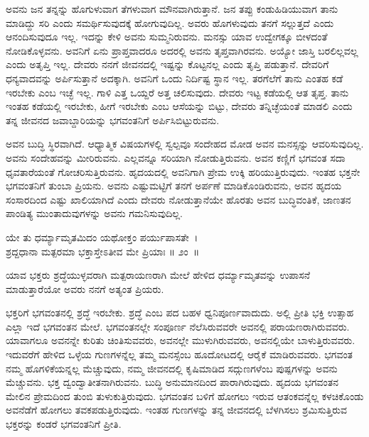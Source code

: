 ಅವನು ಜನ ತನ್ನನ್ನು ಹೊಗುಳುವಾಗ ತೆಗಳುವಾಗ ಮೌನವಾಗಿರುತ್ತಾನೆ. ಜನ ತಪ್ಪು ಕಂಡುಹಿಡಿಯುವಾಗ ತಾನು ಮಾಡಿದ್ದು ಸರಿ ಎಂದು ಸಮರ್ಥಿಸುವುದಕ್ಕೆ ಹೋಗುವುದಿಲ್ಲ. ಅವರು ಹೊಗಳುವುದು ತನಗೆ ಸಲ್ಲುತ್ತದೆ ಎಂದು ಆನಂದಿಸುವುದೂ ಇಲ್ಲ. ಇದನ್ನು ಕೇಳಿ ಅವನು ಸುಮ್ಮನಿರುವನು. ಮನಸ್ಸು ಯಾವ ಉದ್ವೇಗಕ್ಕೂ ಬೀಳದಂತೆ ನೋಡಿಕೊಳ್ಳವನು. ಅವನಿಗೆ ಏನು ಪ್ರಾಪ್ತವಾದರೂ ಅದರಲ್ಲಿ ಅವನು ತೃಪ್ತವಾಗಿರವನು. ಅಯ್ಯೋ ಜಾಸ್ತಿ ಬರಲಿಲ್ಲವಲ್ಲ ಎಂದು ಅತೃಪ್ತಿ ಇಲ್ಲ. ದೇವರು ನನಗೆ ಜೀವನದಲ್ಲಿ ಇಷ್ಟನ್ನು ಕೊಟ್ಟನಲ್ಲ ಎಂದು ತೃಪ್ತಿ ಪಡುತ್ತಾನೆ. ದೇವರಿಗೆ ಧನ್ಯವಾದವನ್ನು ಅರ್ಪಿಸುತ್ತಾನೆ ಅದಕ್ಕಾಗಿ. ಅವನಿಗೆ ಒಂದು ನಿರ್ದಿಷ್ಟ ಸ್ಥಾನ ಇಲ್ಲ. ತರಗೆಲೆಗೆ ತಾನು ಎಂತಹ ಕಡೆ ಇರಬೇಕು ಎಂಬ ಇಚ್ಛೆ ಇಲ್ಲ. ಗಾಳಿ ಎತ್ತ ಒಯ್ದರೆ ಅತ್ತ ಚಲಿಸುವುದು. ದೇವರು ಇಟ್ಟ ಕಡೆಯಲ್ಲಿ ಆತ ತೃಪ್ತ. ತಾನು ಇಂತಹ ಕಡೆಯಲ್ಲಿ ಇರಬೇಕು, ಹೀಗೆ ಇರಬೇಕು ಎಂಬ ಆಸೆಯನ್ನು ಬಿಟ್ಟು, ದೇವರು ತನ್ನಿಚ್ಛೆಯಂತೆ ಮಾಡಲಿ ಎಂದು ತನ್ನ ಜೀವನದ ಜವಾಬ್ದಾರಿಯನ್ನು ಭಗವಂತನಿಗೆ ಅರ್ಪಿಸಿಬಿಟ್ಟುರುವನು.

ಅವನ ಬುದ್ಧಿ ಸ್ಥಿರವಾಗಿದೆ. ಆಧ್ಯಾತ್ಮಿಕ ವಿಷಯಗಳಲ್ಲಿ ಸ್ವಲ್ಪವೂ ಸಂದೇಹದ ಮೋಡ ಅವನ ಮನಸ್ಸನ್ನು ಆವರಿಸುವುದಿಲ್ಲ. ಅವನು ಸಂದೇಹವನ್ನು ಮೀರಿರುವನು. ಎಲ್ಲವನ್ನೂ ಸರಿಯಾಗಿ ನೋಡುತ್ತಿರುವನು. ಅವನ ಕಣ್ಣಿಗೆ ಭಗವಂತ ಸದಾ ಧೃವತಾರೆಯಂತೆ ಗೋಚರಿಸುತ್ತಿರುವನು. ಹೃದಯದಲ್ಲಿ ಅವನಿಗಾಗಿ ಪ್ರೇಮ ಉಕ್ಕಿ ಹರಿಯುತ್ತಿರುವುದು. ಇಂತಹ ಭಕ್ತನೇ ಭಗವಂತನಿಗೆ ತುಂಬಾ ಪ್ರಿಯನು. ಅವನು ಎಷ್ಟುಮಟ್ಟಿಗೆ ತನಗೆ ಅರ್ಪಣೆ ಮಾಡಿಕೊಂಡಿರುವನು, ಅವನ ಹೃದಯ ಸಂಸಾರದಿಂದ ಎಷ್ಟು ಖಾಲಿಯಾಗಿದೆ ಎಂದು ದೇವರು ನೋಡುತ್ತಾನೆಯೇ ಹೊರತು ಅವನ ಬುದ್ಧಿವಂತಿಕೆ, ಜಾಣತನ ಪಾಂಡಿತ್ಯ ಮುಂತಾದುವುಗಳನ್ನು ಅವನು ಗಮನಿಸುವುದಿಲ್ಲ.

\begin{shloka}
ಯೇ ತು ಧರ್ಮ್ಯಾಮೃತಮಿದಂ ಯಥೋಕ್ತಂ ಪರ್ಯುಪಾಸತೇ~।\\ಶ್ರದ್ದಧಾನಾ ಮತ್ಪರಮಾ ಭಕ್ತಾಸ್ತೇಽತೀವ ಮೇ ಪ್ರಿಯಾಃ \hfill॥ ೨ಂ~॥
\end{shloka}

\begin{artha}
ಯಾವ ಭಕ್ತರು ಶ್ರದ್ಧೆಯುಳ್ಳವರಾಗಿ ಮತ್ಪರಾಯಣರಾಗಿ ಮೇಲೆ ಹೇಳಿದ ಧರ್ಮ್ಯಾಮೃತವನ್ನು ಉಪಾಸನೆ ಮಾಡುತ್ತಾರೆಯೋ ಅವರು ನನಗೆ ಅತ್ಯಂತ ಪ್ರಿಯರು.
\end{artha}

ಭಕ್ತರಿಗೆ ಭಗವಂತನಲ್ಲಿ ಶ್ರದ್ಧೆ ಇರಬೇಕು. ಶ್ರದ್ಧೆ ಎಂಬ ಪದ ಬಹಳ ಧ್ವನಿಪೂರ್ಣವಾದುದು. ಅಲ್ಲಿ ಪ್ರೀತಿ ಭಕ್ತಿ ಉತ್ಸಾಹ ಎಲ್ಲಾ ಇದೆ ಭಗವಂತನ ಮೇಲೆ. ಭಗವಂತನಲ್ಲೇ ಸಂಪೂರ್ಣ ನೆಲೆಸಿರುವವರೇ ಅವನಲ್ಲಿ ಪರಾಯಣರಾಗಿರುವವರು. ಯಾವಾಗಲೂ ಅವನನ್ನೇ ಕುರಿತು ಚಿಂತಿಸುವವರು, ಅವನಲ್ಲೇ ಮುಳುಗಿರುವವರು, ಅವನಲ್ಲಿಯೇ ಬಾಳುತ್ತಿರುವವರು. ಇದುವರೆಗೆ ಹೇಳಿದ ಒಳ್ಳೆಯ ಗುಣಗಳನ್ನೆಲ್ಲ ತಮ್ಮ ಮನಸ್ಸೆಂಬ ಹೂದೋಟದಲ್ಲಿ ಆರೈಕೆ ಮಾಡಿರುವವರು. ಭಗವಂತ ನಮ್ಮ ಹೊಗಳಿಕೆಯನ್ನಲ್ಲ ಮೆಚ್ಚುವುದು, ನಮ್ಮ ಜೀವನದಲ್ಲಿ ಕೃಷಿಮಾಡಿದ ಸದ್ಗುಣಗಳೆಂಬ ಪುಷ್ಪಗಳನ್ನು ಅವನು ಮೆಚ್ಚುವನು. ಭಕ್ತ ದ್ವಂದ್ವಾತೀತನಾಗಿರುವನು. ಬುದ್ಧಿ ಅನುಮಾನದಿಂದ ಪಾರಾಗಿರುವುದು. ಹೃದಯ ಭಗವಂತನ ಮೇಲಿನ ಪ್ರೇಮದಿಂದ ತುಂಬಿ ತುಳುಕುತ್ತಿರುವುದು. ಭಗವಂತನ ಬಳಿಗೆ ಹೋಗಲು ಇರುವ ಆತಂಕವನ್ನೆಲ್ಲ ಕಳಚಿಕೊಂಡು ಅವನೆಡೆಗೆ ಹೋಗಲು ತವಕಪಡುತ್ತಿರುವುದು. ಇಂತಹ ಗುಣಗಳನ್ನು ತನ್ನ ಜೀವನದಲ್ಲಿ ಬೆಳಗಿಸಲು ಶ್ರಮಿಸುತ್ತಿರುವ ಭಕ್ತರನ್ನು ಕಂಡರೆ ಭಗವಂತನಿಗೆ ಪ್ರೀತಿ.


